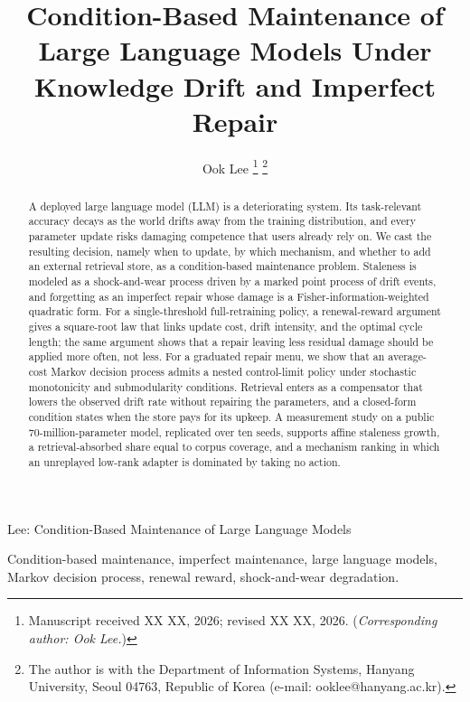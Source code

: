 \documentclass[journal]{IEEEtran}
\begin{document}
\title{Condition-Based Maintenance of Large Language Models Under Knowledge Drift and Imperfect Repair}

\author{Ook Lee%
\thanks{Manuscript received XX XX, 2026; revised XX XX, 2026. (\emph{Corresponding author: Ook Lee.})}%
\thanks{The author is with the Department of Information Systems, Hanyang University, Seoul 04763, Republic of Korea (e-mail: ooklee@hanyang.ac.kr).}}

%
{Lee: Condition-Based Maintenance of Large Language Models}

\maketitle

\begin{abstract}
A deployed large language model (LLM) is a deteriorating system. Its task-relevant accuracy decays as the world drifts away from the training distribution, and every parameter update risks damaging competence that users already rely on. We cast the resulting decision, namely when to update, by which mechanism, and whether to add an external retrieval store, as a condition-based maintenance problem. Staleness is modeled as a shock-and-wear process driven by a marked point process of drift events, and forgetting as an imperfect repair whose damage is a Fisher-information-weighted quadratic form. For a single-threshold full-retraining policy, a renewal-reward argument gives a square-root law that links update cost, drift intensity, and the optimal cycle length; the same argument shows that a repair leaving less residual damage should be applied more often, not less. For a graduated repair menu, we show that an average-cost Markov decision process admits a nested control-limit policy under stochastic monotonicity and submodularity conditions. Retrieval enters as a compensator that lowers the observed drift rate without repairing the parameters, and a closed-form condition states when the store pays for its upkeep. A measurement study on a public 70-million-parameter model, replicated over ten seeds, supports affine staleness growth, a retrieval-absorbed share equal to corpus coverage, and a mechanism ranking in which an unreplayed low-rank adapter is dominated by taking no action.
\end{abstract}

\begin{IEEEkeywords}
Condition-based maintenance, imperfect maintenance, large language models, Markov decision process, renewal reward, shock-and-wear degradation.
\end{IEEEkeywords}
\end{document}
